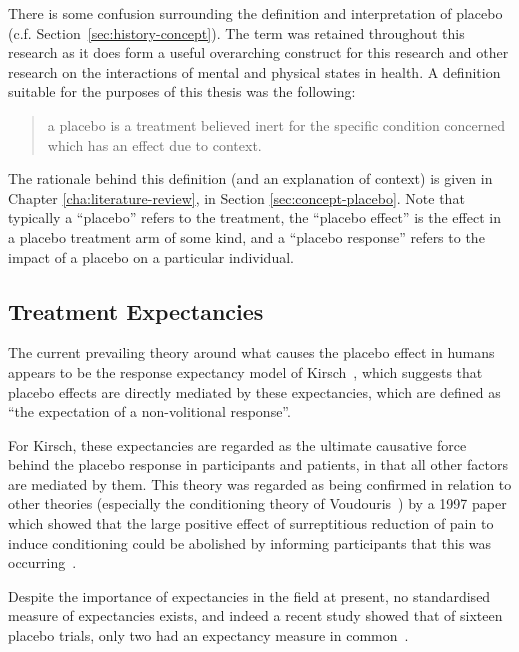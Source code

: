 There is some confusion surrounding the definition and interpretation of placebo (c.f. Section~\ref{sec:history-concept}).  The term was retained throughout this research  as it does form a useful overarching construct for this research and other research on the interactions of mental and physical states in health. A definition suitable for the purposes of this thesis was the following:

\begin{quotation}
  a placebo is a treatment believed inert for the specific condition
  concerned which has an effect due to context.
\end{quotation}

The rationale behind this definition (and an explanation of context) is given in Chapter \ref{cha:literature-review}, in Section \ref{sec:concept-placebo}. Note that typically a ``placebo'' refers to the treatment, the ``placebo effect'' is the effect in a placebo treatment arm of some kind, and a ``placebo response'' refers to the impact of a placebo on a particular individual.



\subsection{Treatment Expectancies}
\label{sec:placebo-expectancies}

The current prevailing theory around what causes the placebo effect in humans appears to be the response expectancy model of Kirsch~\cite{Kirsch1985,Kirsch1997}, which suggests that placebo effects are directly mediated by these expectancies, which are defined as ``the expectation of a non-volitional response''.

For Kirsch, these expectancies are regarded as the ultimate causative force behind the placebo response in participants and patients, in that all other factors are mediated by them. This theory was regarded as being confirmed in relation to other theories (especially the conditioning theory of Voudouris~\cite{Voudouris1985}) by a 1997 paper which showed that the large positive effect of surreptitious reduction of pain to induce conditioning could be abolished by informing participants that this was occurring~\cite{Montgomery1997}.

Despite the importance of expectancies in the field at present, no standardised measure of expectancies exists, and indeed a recent study showed that of sixteen placebo trials, only two had an expectancy measure in common~\cite{myers2008patient}. 

